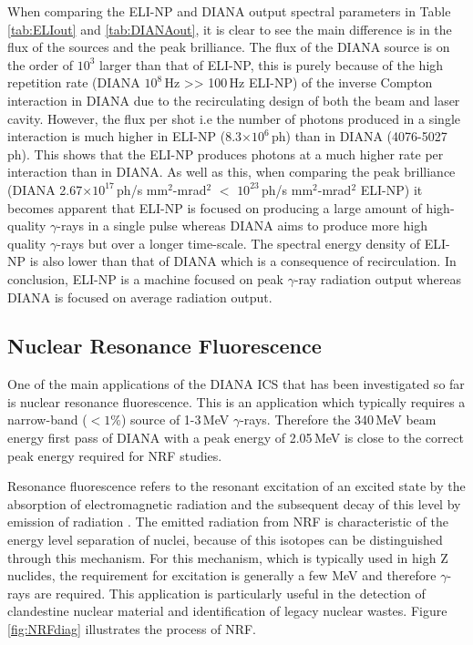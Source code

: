 \documentclass[11pt]{article}
\begin{document}
When comparing the ELI-NP and DIANA output spectral parameters in Table \ref{tab:ELIout} and \ref{tab:DIANAout}, it is clear to see the main difference is in the flux of the sources and the peak brilliance. The flux of the DIANA source is on the order of $10^{3}$ larger than that of ELI-NP, this is purely because of the high repetition rate (DIANA $10^{8}$\,Hz >> 100\,Hz ELI-NP) of the inverse Compton interaction in DIANA due to the recirculating design of both the beam and laser cavity. However, the flux per shot i.e the number of photons produced in a single interaction is much higher in ELI-NP (8.3$\times 10^{6}$\,ph) than in DIANA (4076-5027\,ph). This shows that the ELI-NP produces photons at a much higher rate per interaction than in DIANA. As well as this, when comparing the peak brilliance (DIANA 2.67$\times 10^{17}$\,ph/s mm$^{2}$-mrad$^{2}$ $<$ $10^{23}$\,ph/s mm$^{2}$-mrad$^{2}$ ELI-NP) it becomes apparent that ELI-NP is focused on producing a large amount of high-quality $\gamma$-rays in a single pulse whereas DIANA aims to produce more high quality $\gamma$-rays but over a longer time-scale. The spectral energy density of ELI-NP is also lower than that of DIANA which is a consequence of recirculation. In conclusion, ELI-NP is a machine focused on peak $\gamma$-ray radiation output whereas DIANA is focused on average radiation output. 


\subsection{Nuclear Resonance Fluorescence}

One of the main applications of the DIANA ICS that has been investigated so far is nuclear resonance fluorescence. This is an application which typically requires a narrow-band ($<1\%$) source of 1-3\,MeV $\gamma$-rays. Therefore the 340\,MeV beam energy first pass of DIANA with a peak energy of 2.05\,MeV is close to the correct peak energy required for NRF studies.

Resonance fluorescence refers to the resonant excitation of an excited state by the absorption of electromagnetic radiation and the subsequent decay of this level by emission of radiation \cite{NRFdef}. The emitted radiation from NRF is characteristic of the energy level separation of nuclei, because of this isotopes can be distinguished through this mechanism. For this mechanism, which is typically used in high Z nuclides, the requirement for excitation is generally a few MeV and therefore $\gamma$-rays are required. This application is particularly useful in the detection of clandestine nuclear material and identification of legacy nuclear wastes. Figure \ref{fig:NRFdiag} illustrates the process of NRF.
\end{document}
